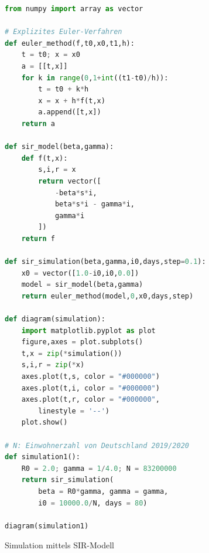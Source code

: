 \documentclass[a4paper,10pt,fleqn,twocolumn,twoside,dvipdfmx]{scrartcl}
\numberwithin{equation}{section}
\begin{document}
\begin{figure}[h!]
\begin{lstlisting}[language=Python]
from numpy import array as vector

# Explizites Euler-Verfahren
def euler_method(f,t0,x0,t1,h):
    t = t0; x = x0
    a = [[t,x]]
    for k in range(0,1+int((t1-t0)/h)):
        t = t0 + k*h
        x = x + h*f(t,x)
        a.append([t,x])
    return a

def sir_model(beta,gamma):
    def f(t,x):
        s,i,r = x
        return vector([
            -beta*s*i,
            beta*s*i - gamma*i,
            gamma*i
        ])
    return f

def sir_simulation(beta,gamma,i0,days,step=0.1):
    x0 = vector([1.0-i0,i0,0.0])
    model = sir_model(beta,gamma)
    return euler_method(model,0,x0,days,step)

def diagram(simulation):
    import matplotlib.pyplot as plot
    figure,axes = plot.subplots()
    t,x = zip(*simulation())
    s,i,r = zip(*x)
    axes.plot(t,s, color = "#000000")
    axes.plot(t,i, color = "#000000")
    axes.plot(t,r, color = "#000000",
        linestyle = '--')
    plot.show()

# N: Einwohnerzahl von Deutschland 2019/2020
def simulation1():
    R0 = 2.0; gamma = 1/4.0; N = 83200000
    return sir_simulation(
        beta = R0*gamma, gamma = gamma,
        i0 = 10000.0/N, days = 80)

diagram(simulation1)
\end{lstlisting}
\caption{Simulation mittels SIR-Modell}
\end{figure}
\end{document}
